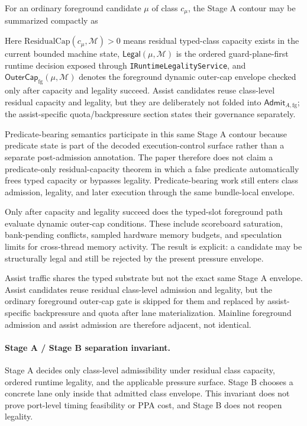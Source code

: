 \documentclass[twocolumn]{article}
\begin{document}
For an ordinary foreground candidate \(\mu\) of class \(c_\mu\), the Stage A contour may be summarized compactly as

Here \(\mathrm{ResidualCap}(c_\mu,\mathcal{M})>0\) means residual typed-class capacity exists in the current bounded machine state, \(\mathsf{Legal}(\mu,\mathcal{M})\) is the ordered guard-plane-first runtime decision exposed through \texttt{IRuntimeLegalityService}, and \(\mathsf{OuterCap}_{\mathrm{fg}}(\mu,\mathcal{M})\) denotes the foreground dynamic outer-cap envelope checked only after capacity and legality succeed. Assist candidates reuse class-level residual capacity and legality, but they are deliberately not folded into \(\mathsf{Admit}_{A,\mathrm{fg}}\); the assist-specific quota/backpressure section states their governance separately.

Predicate-bearing semantics participate in this same Stage A contour because predicate state is part of the decoded execution-control surface rather than a separate post-admission annotation. The paper therefore does not claim a predicate-only residual-capacity theorem in which a false predicate automatically frees typed capacity or bypasses legality. Predicate-bearing work still enters class admission, legality, and later execution through the same bundle-local envelope.

Only after capacity and legality succeed does the typed-slot foreground path evaluate dynamic outer-cap conditions. These include scoreboard saturation, bank-pending conflicts, sampled hardware memory budgets, and speculation limits for cross-thread memory activity. The result is explicit: a candidate may be structurally legal and still be rejected by the present pressure envelope.

Assist traffic shares the typed substrate but not the exact same Stage A envelope. Assist candidates reuse residual class-level admission and legality, but the ordinary foreground outer-cap gate is skipped for them and replaced by assist-specific backpressure and quota after lane materialization. Mainline foreground admission and assist admission are therefore adjacent, not identical.

\paragraph{Stage A / Stage B separation invariant.}
Stage A decides only class-level admissibility under residual class capacity, ordered runtime legality, and the applicable pressure surface. Stage B chooses a concrete lane only inside that admitted class envelope. This invariant does not prove port-level timing feasibility or PPA cost, and Stage B does not reopen legality.
\end{document}
